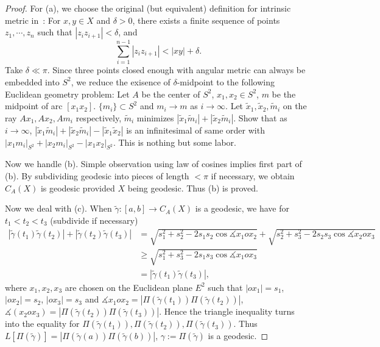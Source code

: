 \begin{proof}
    For (a), we choose the original (but equivalent) definition for intrinsic metric in~\cite{buragoADAlexandrovSpaces1992}:
    For $x,y\in X$ and $\delta>0$, there exists a finite sequence of points $z_1,\cdots,z_n$ such that $|z_iz_{i+1}|<\delta$, and
    \[\sum_{i=1}^{n-1}|z_iz_{i+1}|<|xy|+\delta.\]
    Take $\delta\ll\pi$.
    Since three points closed enough with angular metric can always be embedded into $S^2$, we reduce the exisence of $\delta$-midpoint to the following Euclidean geometry problem:
    Let $A$ be the center of $S^2$, $x_1,x_2\in S^2$, $m$ be the midpoint of arc $[x_1x_2]$.
    $\{m_i\}\subset S^2$ and $m_i\to m$ as $i\to\infty$.
    Let $\tilde{x}_1,\tilde{x}_2,\tilde{m}_i$ on the ray $Ax_1,Ax_2,Am_i$ respectively, $\tilde{m}_i$ minimizes $|\tilde{x}_1\tilde{m}_i|+|\tilde{x}_2\tilde{m}_i|$.
    Show that as $i\to\infty$, $|\tilde{x}_1\tilde{m}_i|+|\tilde{x}_2\tilde{m}_i|-|\tilde{x}_1\tilde{x}_2|$ is an infinitesimal of same order with $|x_1m_i|_{S^2}+|x_2m_i|_{S^2}-|x_1x_2|_{S^2}$.
    This is nothing but some labor.

    Now we handle (b).
    Simple observation using law of cosines implies first part of (b).
    By subdividing geodesic into pieces of length $<\pi$ if necessary, we obtain $C_A(X)$ is geodesic provided $X$ being geodesic.
    Thus (b) is proved.

    Now we deal with (c).
    When $\tilde\gamma:[a,b]\to C_A(X)$ is a geodesic, we have for $t_1<t_2<t_3$ (subdivide if necessary)
    \begin{align*}
        |\tilde\gamma(t_1)\tilde\gamma(t_2)|+|\tilde\gamma(t_2)\tilde\gamma(t_3)|&=\sqrt{s_1^2+s_2^2-2s_1s_2\cos\measuredangle{x_1ox_2}}+\sqrt{s_2^2+s_3^2-2s_2s_3\cos\measuredangle{x_2ox_3}}\\
        &\geq\sqrt{s_1^2+s_3^2-2s_1s_3\cos\measuredangle{x_1ox_3}}\\
        &=|\tilde\gamma(t_1)\tilde\gamma(t_3)|,
    \end{align*}
    where $x_1,x_2,x_3$ are chosen on the Euclidean plane $E^2$ such that $|ox_1|=s_1$, $|ox_2|=s_2$, $|ox_3|=s_3$ and $\measuredangle{x_1ox_2}=|\Pi(\tilde\gamma(t_1))\Pi(\tilde\gamma(t_2))|$, $\measuredangle(x_2ox_3)=|\Pi(\tilde\gamma(t_2))\Pi(\tilde\gamma(t_3))|$.
    Hence the triangle inequality turns into the equality for $\Pi(\tilde\gamma(t_1)),\Pi(\tilde\gamma(t_2)),\Pi(\tilde\gamma(t_3))$. 
    Thus $L[\Pi(\tilde\gamma)]=|\Pi(\tilde\gamma(a))\Pi(\tilde\gamma(b))|$, $\gamma:=\Pi(\tilde\gamma)$ is a geodesic.
\end{proof}

